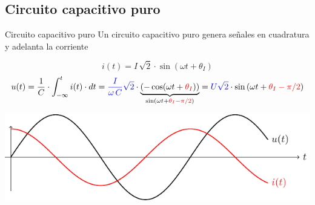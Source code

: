 \documentclass[aspectratio=169, xcolor={usenames,svgnames,dvipsnames}]{beamer}
\begin{document}
\subsection{Circuito capacitivo puro}

\begin{frame}{Circuito capacitivo puro}
Un circuito capacitivo puro genera \alert{señales en cuadratura} y \alert{adelanta la corriente}

\[
    i(t) = I\,\sqrt{2} \cdot \sin(\omega t + \theta_I)
\]
\[
 u(t)=\dfrac{1}{C}\cdot\int_{-\infty}^{t} i(t)\cdot dt={\color{blue}\dfrac{I}{\omega\,C}\sqrt{2}}\cdot\underbrace{(-\cos (\omega t+{\color{red}\theta_I}))}_{\sin(\omega t+{\color{red}\theta_I-\pi/2})}={\color{blue}U\sqrt{2}}\cdot\sin \left(\omega t+{\color{red}\theta_I-\pi/2}\right)
\]
     

\begin{center}
\includegraphics[height=0.3\textheight]{../figs/capacitivoPuro.pdf}
\end{center}
\end{frame}
\end{document}
